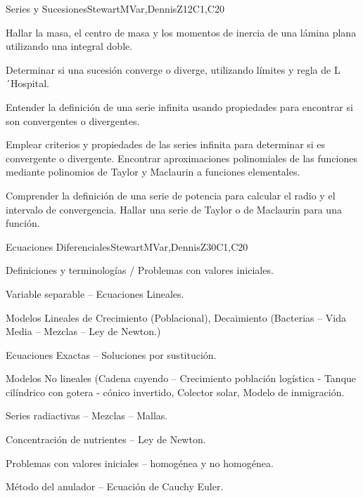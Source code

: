 \begin{syllabus}
\begin{unit}{Series y Sucesiones}{}{StewartMVar,DennisZ}{12}{C1,C20}
  \begin{learningoutcomes}
    \item Hallar la masa, el centro de masa y los momentos de inercia de una lámina plana utilizando una integral doble.
    \item Determinar si una sucesión converge o diverge, utilizando límites y regla de L´Hospital.
    \item Entender la definición de una serie infinita usando propiedades para encontrar si son convergentes o divergentes.
    \item Emplear criterios y propiedades de las series infinita para determinar si es convergente o divergente. Encontrar aproximaciones polinomiales de las funciones mediante polinomios de Taylor y Maclaurin a funciones elementales.
    \item Comprender la definición de una serie de potencia para calcular el radio y el intervalo de convergencia. Hallar una serie de Taylor o de Maclaurin para una función.
    \end{learningoutcomes}
\end{unit}

\begin{unit}{Ecuaciones Diferenciales}{}{StewartMVar,DennisZ}{30}{C1,C20}
  \begin{topics}
    \item Definiciones y terminologías / Problemas con valores iniciales.
    \item Variable separable – Ecuaciones Lineales.
    \item Modelos Lineales de Crecimiento (Poblacional), Decaimiento (Bacterias – Vida Media – Mezclas – Ley de Newton.)
    \item Ecuaciones Exactas – Soluciones por sustitución.
    \item Modelos No lineales (Cadena cayendo – Crecimiento población logística - Tanque cilíndrico con gotera - cónico invertido, Colector solar, Modelo de inmigración.
    \item Series radiactivas – Mezclas – Mallas.
    \item Concentración de nutrientes – Ley de Newton.
    \item Problemas con valores iniciales – homogénea y no homogénea.
    \item Método del anulador – Ecuación de Cauchy Euler.
   \end{topics}
  

\end{unit}
\end{syllabus}
